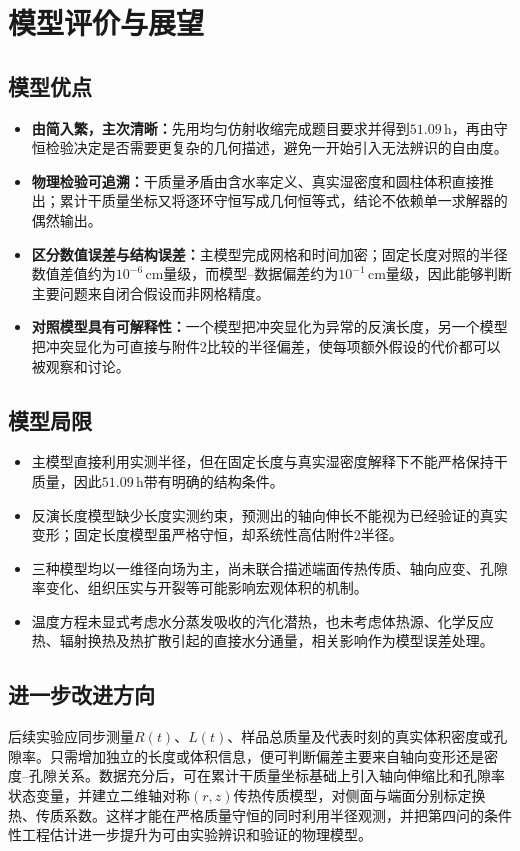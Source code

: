 \documentclass[withoutpreface,bwprint]{cumcmthesis}
\begin{document}
\section{模型评价与展望}

\subsection{模型优点}
\begin{itemize}[leftmargin=2em,itemsep=2pt,topsep=2pt]
  \item \textbf{由简入繁，主次清晰：}先用均匀仿射收缩完成题目要求并得到$51.09\,\mathrm h$，再由守恒检验决定是否需要更复杂的几何描述，避免一开始引入无法辨识的自由度。
  \item \textbf{物理检验可追溯：}干质量矛盾由含水率定义、真实湿密度和圆柱体积直接推出；累计干质量坐标又将逐环守恒写成几何恒等式，结论不依赖单一求解器的偶然输出。
  \item \textbf{区分数值误差与结构误差：}主模型完成网格和时间加密；固定长度对照的半径数值差值约为$10^{-6}\,\mathrm{cm}$量级，而模型--数据偏差约为$10^{-1}\,\mathrm{cm}$量级，因此能够判断主要问题来自闭合假设而非网格精度。
  \item \textbf{对照模型具有可解释性：}一个模型把冲突显化为异常的反演长度，另一个模型把冲突显化为可直接与附件2比较的半径偏差，使每项额外假设的代价都可以被观察和讨论。
\end{itemize}

\subsection{模型局限}
\begin{itemize}[leftmargin=2em,itemsep=2pt,topsep=2pt]
  \item 主模型直接利用实测半径，但在固定长度与真实湿密度解释下不能严格保持干质量，因此$51.09\,\mathrm h$带有明确的结构条件。
  \item 反演长度模型缺少长度实测约束，预测出的轴向伸长不能视为已经验证的真实变形；固定长度模型虽严格守恒，却系统性高估附件2半径。
  \item 三种模型均以一维径向场为主，尚未联合描述端面传热传质、轴向应变、孔隙率变化、组织压实与开裂等可能影响宏观体积的机制。
  \item 温度方程未显式考虑水分蒸发吸收的汽化潜热，也未考虑体热源、化学反应热、辐射换热及热扩散引起的直接水分通量，相关影响作为模型误差处理。
\end{itemize}

\subsection{进一步改进方向}
后续实验应同步测量$R(t)$、$L(t)$、样品总质量及代表时刻的真实体积密度或孔隙率。只需增加独立的长度或体积信息，便可判断偏差主要来自轴向变形还是密度--孔隙关系。数据充分后，可在累计干质量坐标基础上引入轴向伸缩比和孔隙率状态变量，并建立二维轴对称$(r,z)$传热传质模型，对侧面与端面分别标定换热、传质系数。这样才能在严格质量守恒的同时利用半径观测，并把第四问的条件性工程估计进一步提升为可由实验辨识和验证的物理模型。
\end{document}
